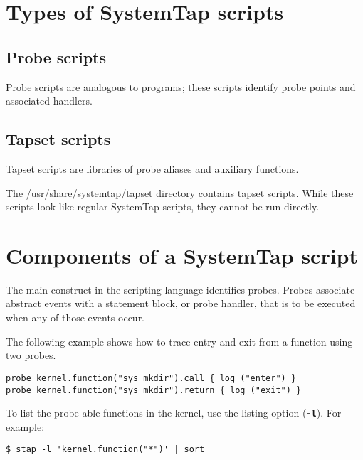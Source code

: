 \documentclass[twoside,english]{article}
\newenvironment{vindent}
{\begin{list}{}{\setlength{\listparindent}{6pt}}
\item[]}
{\end{list}}
\begin{document}
\section{Types of SystemTap scripts\label{sec:Types-of-SystemTap}}

\subsection{Probe scripts}

Probe scripts are analogous to programs; these scripts identify probe points
and associated handlers.

\subsection{Tapset scripts}

Tapset scripts are libraries of probe aliases and auxiliary functions.

The /usr/share/systemtap/tapset directory contains tapset scripts. While
these scripts look like regular SystemTap scripts, they cannot be run directly.

\section{Components of a SystemTap script}

The main construct in the scripting language identifies probes. Probes associate
abstract events with a statement block, or probe handler, that is to be executed
when any of those events occur.

The following example shows how to trace entry and exit from a function using
two probes.

\begin{vindent}
\begin{verbatim}
probe kernel.function("sys_mkdir").call { log ("enter") }
probe kernel.function("sys_mkdir").return { log ("exit") }
\end{verbatim}
\end{vindent}

To list the probe-able functions in the kernel, use the listing option
(\texttt{\textbf{-l}}).  For example:

\begin{vindent}
\begin{verbatim}
$ stap -l 'kernel.function("*")' | sort
\end{verbatim}
\end{vindent}
\end{document}
